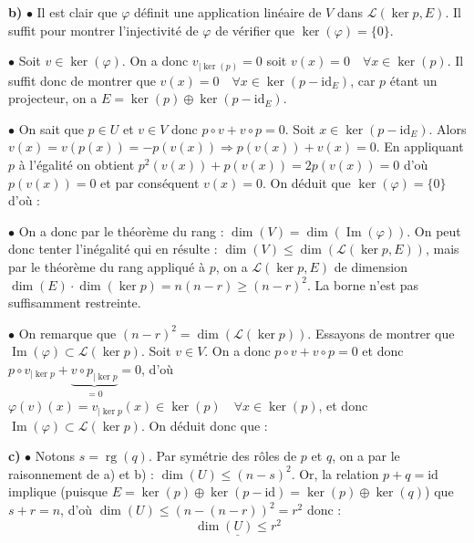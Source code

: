 \documentclass[11pt,a4paper]{report}
\begin{document}
\noindent \textbf{b)} $\bullet$ Il est clair que $\varphi$ définit une application linéaire de $V$ dans $\mathcal{L}(\ker p, E)$. Il suffit pour montrer l'injectivité de $\varphi$ de vérifier que $\ker(\varphi) = \{0\}$.

\noindent $\bullet$ Soit $v \in \ker(\varphi)$. On a donc $v_{|\ker(p)} = 0$ soit $v(x) = 0 \quad \forall x \in \ker(p)$. Il suffit donc de montrer que $v(x) = 0 \quad \forall x \in \ker(p - \mathrm{id}_E)$, car $p$ étant un projecteur, on a $E = \ker(p) \oplus \ker(p - \mathrm{id}_E)$.

\noindent $\bullet$ On sait que $p \in U$ et $v \in V$ donc $p \circ v + v \circ p = 0$. Soit $x \in \ker(p - \mathrm{id}_E)$. Alors $v(x) = v(p(x)) = -p(v(x)) \Rightarrow p(v(x)) + v(x) = 0$. En appliquant $p$ à l'égalité on obtient $p^2(v(x)) + p(v(x)) = 2p(v(x)) = 0$ d'où $p(v(x)) = 0$ et par conséquent $v(x) = 0$. On déduit que $\ker(\varphi) = \{0\}$ d'où :
\begin{center}
\end{center}

\noindent $\bullet$ On a donc par le théorème du rang : $\dim(V) = \dim(\operatorname{Im}(\varphi))$. On peut donc tenter l'inégalité qui en résulte : $\dim(V) \leqslant \dim(\mathcal{L}(\ker p, E))$, mais par le théorème du rang appliqué à $p$, on a $\mathcal{L}(\ker p, E)$ de dimension $\dim(E) \cdot \dim(\ker p) = n(n-r) \geqslant (n-r)^2$. La borne n'est pas suffisamment restreinte.

\noindent $\bullet$ On remarque que $(n-r)^2 = \dim(\mathcal{L}(\ker p))$. Essayons de montrer que $\operatorname{Im}(\varphi) \subset \mathcal{L}(\ker p)$. Soit $v \in V$. On a donc $p \circ v + v \circ p = 0$ et donc $p \circ v_{|\ker p} + \underbrace{v \circ p_{|\ker p}}_{= 0} = 0$, d'où $\varphi(v)(x) = v_{|\ker p}(x) \in \ker(p) \quad \forall x \in \ker(p)$, et donc $\operatorname{Im}(\varphi) \subset \mathcal{L}(\ker p)$. On déduit donc que :
\begin{center}
\end{center}
\vspace{0.5cm}

\noindent \textbf{c)} $\bullet$ Notons $s = \operatorname{rg}(q)$. Par symétrie des rôles de $p$ et $q$, on a par le raisonnement de a) et b) : $\dim(U) \leqslant (n-s)^2$. Or, la relation $p+q = \mathrm{id}$ implique (puisque $E = \ker(p) \oplus \ker(p-\mathrm{id}) = \ker(p) \oplus \ker(q)$) que $s+r = n$, d'où $\dim(U) \leqslant (n-(n-r))^2 = r^2$ donc :
$$ \underline{\dim(U) \leqslant r^2} $$
\end{document}

